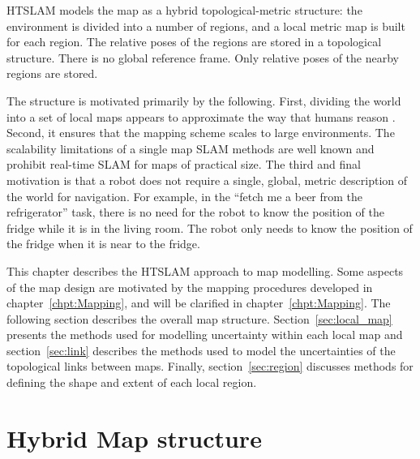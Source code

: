 HTSLAM models the map as a hybrid topological-metric structure: the
environment is divided into a number of regions, and a local metric
map is built for each region. The relative poses of the regions are
stored in a topological structure. There is no global reference
frame. Only relative poses of the nearby regions are stored.


The structure is motivated primarily by the following.  First,
dividing the world into a set of local maps appears to approximate the
way that humans reason \cite{psycho_kuipers82}. Second, it ensures
that the mapping scheme scales to large environments.  The scalability
limitations of a single map SLAM methods are well known
\cite{guivant04,guivant01,guivant02} and prohibit real-time SLAM for
maps of practical size.  The third and final motivation is that a
robot does not require a single, global, metric description of the
world for navigation. For example, in the ``fetch me a beer from the
refrigerator'' task, there is no need for the robot to know the
position of the fridge while it is in the living room.  The robot only
needs to know the position of the fridge when it is near to the
fridge.

This chapter describes the HTSLAM approach to map modelling.  Some
aspects of the map design are motivated by the mapping procedures
developed in chapter~\ref{chpt:Mapping}, and will be clarified in
chapter~\ref{chpt:Mapping}. %
The following section describes the overall map structure.
Section~\ref{sec:local_map} presents the methods used for modelling
uncertainty within each local map and section~\ref{sec:link} describes
the methods used to model the uncertainties of the topological links
between maps.  Finally, section~\ref{sec:region} discusses methods for
defining the shape and extent of each local region.

\section{Hybrid Map structure}
\label{sec:HM_structure}

